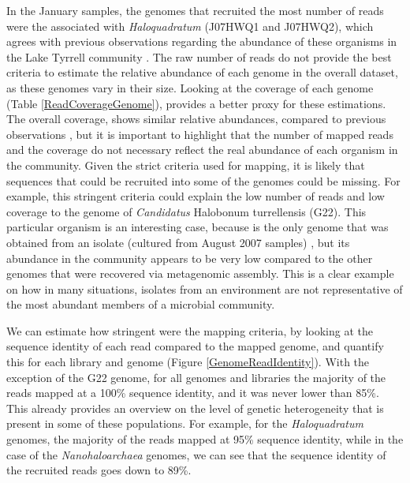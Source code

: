 In the January samples, the genomes that recruited the most number of reads were the associated with \textit{Haloquadratum} (J07HWQ1 and J07HWQ2), which agrees with previous observations regarding the abundance of these organisms in the Lake Tyrrell community \cite{Podell:2013kx}. The raw number of reads do not provide the best criteria to estimate the relative abundance of each genome in the overall dataset, as these genomes vary in their size. Looking at the coverage of each genome (Table \ref{ReadCoverageGenome}), provides a better proxy for these estimations. The overall coverage, shows similar relative abundances, compared to previous observations \cite{Podell:2013kx}, but it is important to highlight that the number of mapped reads and the coverage do not necessary reflect the real abundance of each organism in the community. Given the strict criteria used for mapping, it is likely that sequences that could be recruited into some of the genomes could be missing. For example, this stringent criteria could explain the low number of reads and low coverage to the genome of \textit{Candidatus} Halobonum turrellensis (G22). This particular organism is an interesting case, because is the only genome that was obtained from an isolate (cultured from August 2007 samples) \cite{Ugalde:2013hb}, but its abundance in the community appears to be very low compared to the other genomes that were recovered via metagenomic assembly. This is a clear example on how in many situations, isolates from an environment are not representative of the most abundant members of a microbial community.

We can estimate how stringent were the mapping criteria, by looking at the sequence identity of each read compared to the mapped genome, and quantify this for each library and genome (Figure \ref{GenomeReadIdentity}). With the exception of the G22 genome, for all genomes and libraries the majority of the reads mapped at a 100\% sequence identity, and it was never lower than 85\%. This already provides an overview on the level of genetic heterogeneity that is present in some of these populations. For example, for the \textit{Haloquadratum} genomes, the majority of the reads mapped at 95\% sequence identity, while in the case of the \textit{Nanohaloarchaea} genomes, we can see that the sequence identity of the recruited reads goes down to 89\%.

